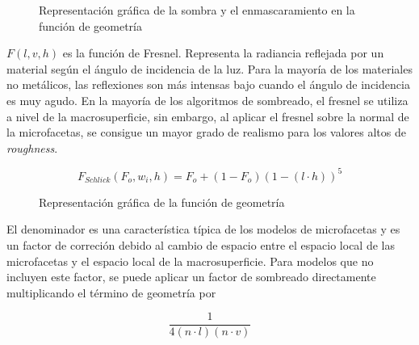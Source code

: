             \begin{figure}[H]
                \vspace{0.5cm}
                \centering
                \caption{Representaci\'on gr\'afica de la sombra y el enmascaramiento en la funci\'on de geometr\'ia}
            \end{figure}
    
            $F(l, v, h)$ es la funci\'on de Fresnel. Representa la radiancia reflejada por un material seg\'un el \'angulo de incidencia
            de la luz. Para la mayor\'ia de los materiales no met\'alicos, las reflexiones son m\'as intensas bajo cuando el \'angulo
            de incidencia es muy agudo. En la mayor\'ia de los algoritmos de sombreado, el fresnel se utiliza a nivel de la macrosuperficie,
            sin embargo, al aplicar el fresnel sobre la normal de la microfacetas, se consigue un mayor grado de realismo para los valores
            altos de \textit{roughness}.
    
            $$
            F_{Schlick}(F_o, w_i, h) = F_o + (1 - F_o) (1 - (l\cdot{h}))^5
            $$
    
            \begin{figure}[H]
                \vspace{0.5cm}
                \centering
                \caption{Representaci\'on gr\'afica de la funci\'on de geometr\'ia}
            \end{figure}
            \singlespacing
    
            El denominador es una caracter\'istica t\'ipica de los modelos de microfacetas y es un factor de correci\'on debido al cambio
            de espacio entre el espacio local de las microfacetas y el espacio local de la macrosuperficie. Para modelos que no
            incluyen este factor, se puede aplicar un factor de sombreado directamente multiplicando el t\'ermino de geometr\'ia por
    
            \begin{equation}
            \frac{1}{4(n\cdot{l}) (n\cdot{v})}
            \end{equation}
            \singlespacing
    
    
